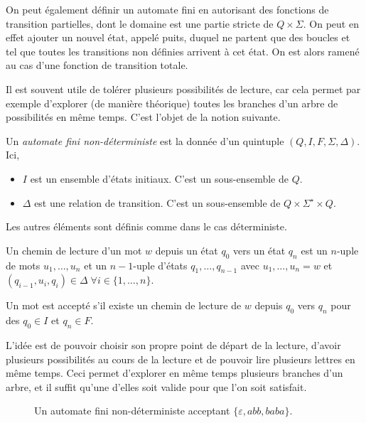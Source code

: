 \begin{rem}
On peut également définir un automate fini en autorisant des fonctions de transition partielles, dont le domaine est une partie stricte de $Q\times\Sigma$. On peut en effet ajouter un nouvel état, appelé puits, duquel ne partent que des boucles et tel que toutes les transitions non définies arrivent à cet état. On est alors ramené au cas d'une fonction de transition totale.
\end{rem}

Il est souvent utile de tolérer plusieurs possibilités de lecture, car cela permet par exemple d'explorer (de manière théorique) toutes les branches d'un arbre de possibilités en même temps. C'est l'objet de la notion suivante.

\begin{dfn}
Un \emph{automate fini non-déterministe} est la donnée d'un quintuple $(Q, I, F, \Sigma, \Delta)$. Ici,
\begin{itemize}
\item $I$ est un ensemble d'états initiaux. C'est un sous-ensemble de $Q$.
\item $\Delta$ est une relation de transition. C'est un sous-ensemble de $Q\times \Sigma^\star\times Q$.
\end{itemize}
Les autres éléments sont définis comme dans le cas déterministe.

Un chemin de lecture d'un mot $w$ depuis un état $q_0$ vers un état $q_n$ est un $n$-uple de mots $u_1, \dots, u_n$ et un $n-1$-uple d'états $q_1, \dots, q_{n-1}$ avec $u_1, \dots, u_n = w$ et $(q_{i - 1}, u_i, q_i)\in\Delta\;\forall i\in \{1, \dots, n\}$.

Un mot est accepté s'il existe un chemin de lecture de $w$ depuis $q_0$ vers $q_n$ pour des $q_0\in I$ et $q_n\in F$.
\end{dfn}

L'idée est de pouvoir choisir son propre point de départ de la lecture, d'avoir plusieurs possibilités au cours de la lecture et de pouvoir lire plusieurs lettres en même temps. Ceci permet d'explorer en même temps plusieurs branches d'un arbre, et il suffit qu'une d'elles soit valide pour que l'on soit satisfait.

\begin{figure}
\centering
{}
\caption{Un automate fini non-déterministe acceptant $\{\varepsilon,abb,baba\}$.}
\label{sk:fig:nfa1}
\end{figure}

